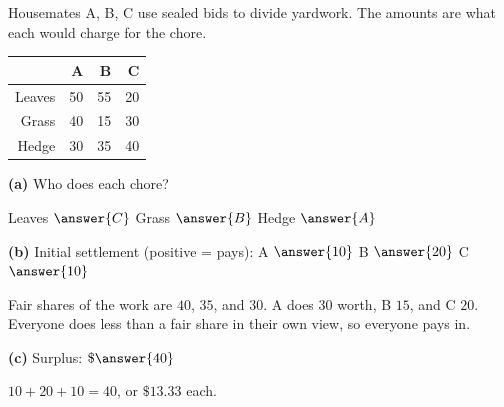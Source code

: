 \documentclass[12pt]{ximera}
\begin{document}
\begin{problem}
Housemates A, B, C use sealed bids to divide yardwork. The amounts are what each would
charge for the chore.
\begin{center}
\begin{tabular}{r|rrr}
 & A & B & C\\\hline
Leaves & 50 & 55 & 20\\
Grass & 40 & 15 & 30\\
Hedge & 30 & 35 & 40
\end{tabular}
\end{center}

\begin{prompt}
\textbf{(a)} Who does each chore?

Leaves $\answer{C}$ \quad Grass $\answer{B}$ \quad Hedge $\answer{A}$
\end{prompt}

\begin{prompt}
\textbf{(b)} Initial settlement (positive = pays): A $\answer{10}$ \quad B $\answer{20}$
\quad C $\answer{10}$
\begin{feedback}
Fair shares of the work are $40$, $35$, and $30$. A does $30$ worth, B $15$, and C $20$.
Everyone does less than a fair share in their own view, so everyone pays in.
\end{feedback}
\end{prompt}

\begin{prompt}
\textbf{(c)} Surplus: $\$\answer{40}$
\begin{feedback}
$10+20+10=40$, or $\$13.33$ each.
\end{feedback}
\end{prompt}
\end{problem}
\end{document}
